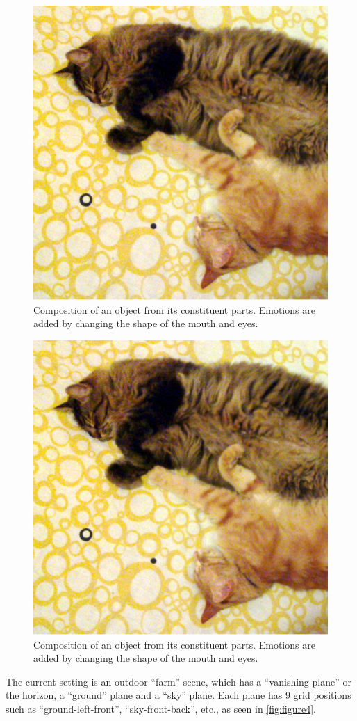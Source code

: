 \documentclass{sigchi-ext}
\begin{document}
\begin{figure}
  \centering
  \includegraphics[width=0.7\columnwidth]{figures/cats.png}
  \caption{Composition of an object from its constituent parts.  Emotions are added by changing the shape of the mouth and eyes.}
  \label{fig:figure2}
\end{figure}

\begin{figure}
  \centering
  \includegraphics[width=0.7\columnwidth]{figures/cats.png}
  \caption{Composition of an object from its constituent parts.  Emotions are added by changing the shape of the mouth and eyes.}
  \label{fig:figure3}
\end{figure}

The current setting is an outdoor ``farm'' scene, which has a ``vanishing plane'' or the horizon, a ``ground'' plane and a ``sky'' plane. Each plane has 9 grid positions such as ``ground-left-front'', ``sky-front-back'', etc., as seen in \autoref {fig:figure4}.
\end{document}
